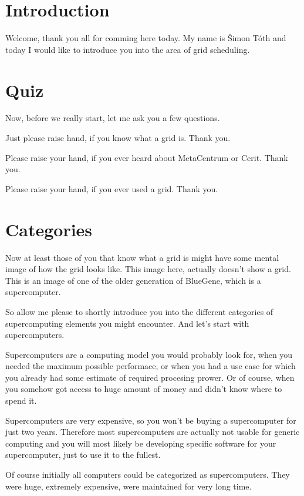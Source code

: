 \documentclass[10pt]{article}
\begin{document}
\section{Introduction}

Welcome, thank you all for comming here today.
My name is Šimon Tóth and today I would like to introduce you into the area of grid scheduling.

\section{Quiz}

Now, before we really start, let me ask you a few questions.

Just please raise hand, if you know what a grid is. Thank you.

Please raise your hand, if you ever heard about MetaCentrum or Cerit. Thank you.

Please raise your hand, if you ever used a grid. Thank you.

\section{Categories}

Now at least those of you that know what a grid is might have some mental image
of how the grid looks like.  This image here, actually doesn't show a grid.
This is an image of one of the older generation of BlueGene, which is a
supercomputer.

So allow me please to shortly introduce you into the different categories of
supercomputing elements you might encounter.  And let's start with
supercomputers.

Supercomputers are a computing model you would probably look for, when you needed the
maximum possible performace, or when you had a use case for which you already
had some estimate of required procesing prower. Or of course, when you somehow
got access to huge amount of money and didn't know where to spend it.

Supercomputers are very expensive, so you won't be buying a supercomputer for
just two years. Therefore most supercomputers are actually not usable for
generic computing and you will most likely be developing specific software for
your supercomputer, just to use it to the fullest.

Of course initially all computers could be categorized as supercomputers. They
were huge, extremely expensive, were maintained for very long time.
\end{document}
